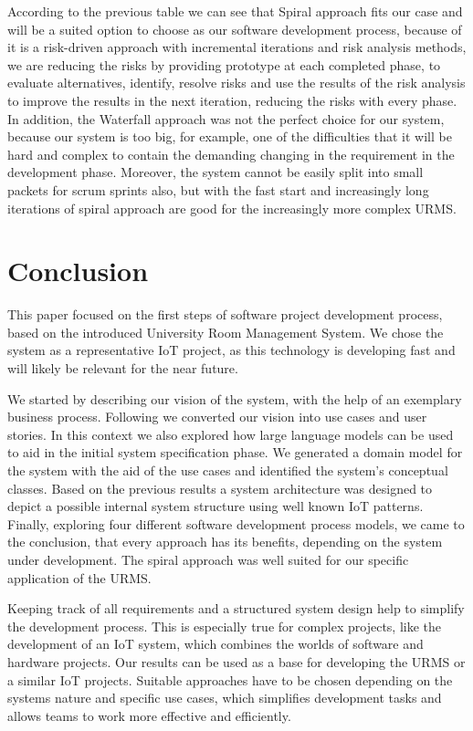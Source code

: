 \documentclass[conference,onecolumn]{IEEEtran}
\begin{document}
	According to the previous table we can see that Spiral approach fits our case and will be a suited option to choose as our software development process, because of it is a risk-driven approach with incremental iterations and risk analysis methods, we are reducing the risks by providing prototype at each completed phase, to evaluate alternatives, identify, resolve risks and use the results of the risk analysis to improve the results in the next iteration, reducing the risks with every phase. In addition, the Waterfall approach was not the perfect choice for our system, because our system is too big, for example, one of the difficulties that it will be hard and complex to contain the demanding changing in the requirement in the development phase. Moreover, the system cannot be easily split into small packets for scrum sprints also, but with the fast start and increasingly long iterations of spiral approach are good for the increasingly more complex URMS.


\section{Conclusion}
	This paper focused on the first steps of software project development process, based on the introduced University Room Management System.
	We chose the system as a representative IoT project, as this technology is developing fast and will likely be relevant for the near future.
	
	We started by describing our vision of the system, with the help of an exemplary business process.
	Following we converted our vision into use cases and user stories.
	In this context we also explored how large language models can be used to aid in the initial system specification phase.
	We generated a domain model for the system with the aid of the use cases and identified the system's conceptual classes.
	Based on the previous results a system architecture was designed to depict a possible internal system structure using well known IoT patterns.
	Finally, exploring four different software development process models, we came to the conclusion, that every approach has its benefits, depending on the system under development. The spiral approach was well suited for our specific application of the URMS.
	
	Keeping track of all requirements and a structured system design help to simplify the development process. This is especially true for complex projects, like the development of an IoT system, which combines the worlds of software and hardware projects.
	Our results can be used as a base for developing the URMS or a similar IoT projects. Suitable approaches have to be chosen depending on the systems nature and specific use cases, which simplifies development tasks and allows teams to work more effective and efficiently.
\end{document}
